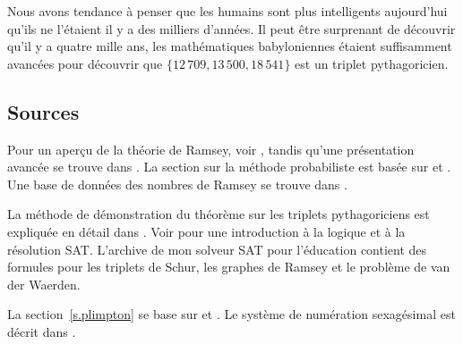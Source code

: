 Nous avons tendance à penser que les humains sont plus intelligents aujourd'hui qu'ils ne l'étaient il y a des milliers d'années. Il peut être surprenant de découvrir qu'il y a quatre mille ans, les mathématiques babyloniennes étaient suffisamment avancées pour découvrir que $\{12\,709, 13\,500, 18\,541\}$ est un triplet  pythagoricien.

\subsection*{Sources}

Pour un aperçu de la théorie de Ramsey, voir \cite{burton}, tandis qu'une présentation avancée se trouve dans \cite{rudiments}. La section sur la méthode probabiliste est basée sur \cite[exemple~4o]{ross} et \cite[chap.~4]{burton}. Une base de données des nombres de Ramsey se trouve dans \cite{mckay}.

La méthode de démonstration du théorème sur les triplets pythagoriciens est expliquée en détail dans \cite{brute}. Voir \cite{mlcs} pour une introduction à la logique et à la résolution SAT. L'archive de mon solveur SAT pour l'éducation \cite{joss} contient des formules pour les triplets de Schur, les graphes de Ramsey et le problème de van der Waerden. 

La section~\ref{s.plimpton} se base sur \cite{wiki:plimpton} et  \cite{robson}. 
Le système de numération sexagésimal est décrit dans \cite{wiki:sexagesimal}.
